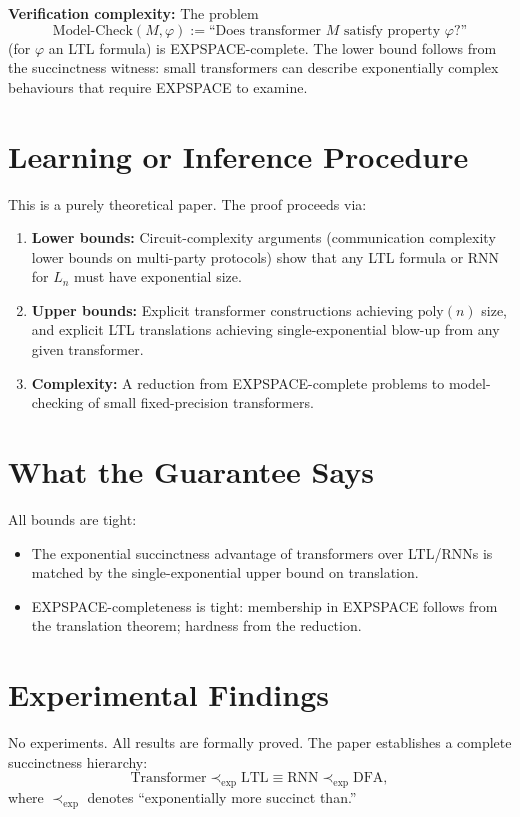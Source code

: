 \documentclass[10pt,twocolumn]{article}
\begin{document}
\textbf{Verification complexity:} The problem
\[
\text{Model-Check}(M, \varphi) :=
  \text{``Does transformer } M \text{ satisfy property } \varphi \text{?''}
\]
(for $\varphi$ an LTL formula) is EXPSPACE-complete. The lower bound
follows from the succinctness witness: small transformers can describe
exponentially complex behaviours that require EXPSPACE to examine.

\section{Learning or Inference Procedure}

This is a purely theoretical paper. The proof proceeds via:
\begin{enumerate}[itemsep=2pt,parsep=0pt]
  \item \textbf{Lower bounds:} Circuit-complexity arguments (communication
    complexity lower bounds on multi-party protocols) show that any
    LTL formula or RNN for $L_n$ must have exponential size.
  \item \textbf{Upper bounds:} Explicit transformer constructions achieving
    $\mathrm{poly}(n)$ size, and explicit LTL translations achieving
    single-exponential blow-up from any given transformer.
  \item \textbf{Complexity:} A reduction from EXPSPACE-complete problems
    to model-checking of small fixed-precision transformers.
\end{enumerate}

\section{What the Guarantee Says}

All bounds are tight:
\begin{itemize}[itemsep=2pt,parsep=0pt]
  \item The exponential succinctness advantage of transformers over LTL/RNNs
    is matched by the single-exponential upper bound on translation.
  \item EXPSPACE-completeness is tight: membership in EXPSPACE follows from
    the translation theorem; hardness from the reduction.
\end{itemize}

\section{Experimental Findings}

No experiments. All results are formally proved. The paper establishes a
complete succinctness hierarchy:
\[
\text{Transformer} \prec_{\exp} \text{LTL} \equiv \text{RNN}
  \prec_{\exp} \text{DFA},
\]
where $\prec_{\exp}$ denotes ``exponentially more succinct than.''
\end{document}
